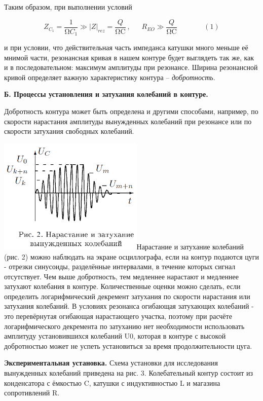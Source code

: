 Таким образом, при выполнении условий

\[Z_{C_{1}} = \frac{1}{\mathrm{\Omega}C_{1}} \gg \left| Z \right|_{rez} = \frac{Q}{\text{ΩC}}\ ,\ \ \ \ \ \ \ R_{EO} \gg \frac{Q}{\text{ΩC}}\ \ \ \ \ \ \ \ \ \ \ \ \ \ \ \ \ (1)\]

и при условии, что действительная часть импеданса катушки много меньше
её мнимой части, резонансная кривая в нашем контуре будет выглядеть так
же, как и в последовательном: максимум амплитуды при резонансе. Ширина
резонансной кривой определяет важную характеристику контура --
\emph{добротность}.

\textbf{Б. Процессы установления и затухания колебаний в контуре.}

Добротность контура может быть определена и другими способами, например,
по скорости нарастания амплитуды вынужденных колебаний при резонансе или
по скорости затухания свободных колебаний.

\includegraphics[width=2.72431in,height=2.17778in]{./media/image2.PNG}Нарастание
и затухание колебаний (рис. 2) можно наблюдать на экране осциллографа,
если на контур подаются цуги - отрезки синусоиды, разделённые
интервалами, в течение которых сигнал отсутствует. Чем выше добротность,
тем медленнее нарастают и медленнее затухают колебания в контуре.
Количественные оценки можно сделать, если определить логарифмический
декремент затухания по скорости нарастания или затухания колебаний. В
условиях резонанса огибающая затухающих колебаний - это перевёрнутая
огибающая нарастающего участка, поэтому при расчёте логарифмического
декремента по затуханию нет необходимости использовать амплитуду
установившихся колебаний U0, которая в контуре с высокой добротностью
может не успеть установиться за время продолжительности цуга.

\textbf{Экспериментальная установка.} Схема установки для исследования
вынужденных колебаний приведена на рис. 3. Колебательный контур состоит
из конденсатора с ёмкостью C, катушки с индуктивностью L и магазина
сопротивлений R.


